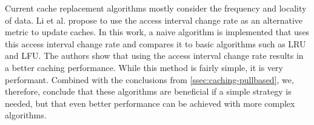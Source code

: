 \noindent Current cache replacement algorithms mostly consider the frequency and locality of data. Li et al. \cite{10.1109/ICPADS.2012.106} propose to use the access interval change rate as an alternative metric to update caches. In this work, a naive algorithm is implemented that uses this access interval change rate and compares it to basic algorithms such as LRU and LFU. The authors show that using the access interval change rate results in a better caching performance. While this method is fairly simple, it is very performant. Combined with the conclusions from \cref{ssec:caching-pullbased}, we, therefore, conclude that these algorithms are beneficial if a simple strategy is needed, but that even better performance can be achieved with more complex algorithms.
